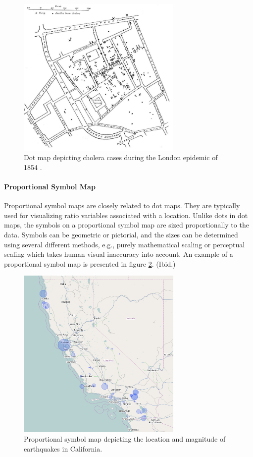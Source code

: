 \begin{figure}[htbp]
  \begin{center}
    \includegraphics[width=8cm]{images/dot-example.jpg}
    \caption{Dot map depicting cholera cases during the London epidemic of 1854 \citep{snow_cholera_1854}.}
    \label{fig:dot}
  \end{center}
\end{figure}

\paragraph{Proportional Symbol Map}

Proportional symbol maps are closely related to dot maps. They are typically used for visualizing ratio variables associated with a location. Unlike dots in dot maps, the symbols on a proportional symbol map are sized proportionally to the data. Symbols can be geometric or pictorial, and the sizes can be determined using several different methods, e.g., purely mathematical scaling or perceptual scaling which takes human visual inaccuracy into account. An example of a proportional symbol map is presented in figure \ref{fig:proportionalsymbol}. (Ibid.)

\begin{figure}[htbp]
  \begin{center}
    \includegraphics[width=8cm]{images/proportionalsymbol-example.png}
    \caption{Proportional symbol map depicting the location and magnitude of earthquakes in California.}
    \label{fig:proportionalsymbol}
  \end{center}
\end{figure}

